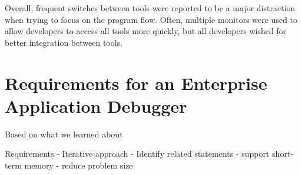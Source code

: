 Overall, frequent switches between tools were reported to be a major distraction when trying to focus on the program flow.
Often, multiple monitors were used to allow developers to access all tools more quickly, but all developers wished for better integration between tools.
\tmpEnd

\section{Requirements for an Enterprise Application Debugger}

Based on what we learned about


Requirements
- Iterative approach
- Identify related statements
- support short-term memory
- reduce problem size



%
%
%
%
%
%
%
